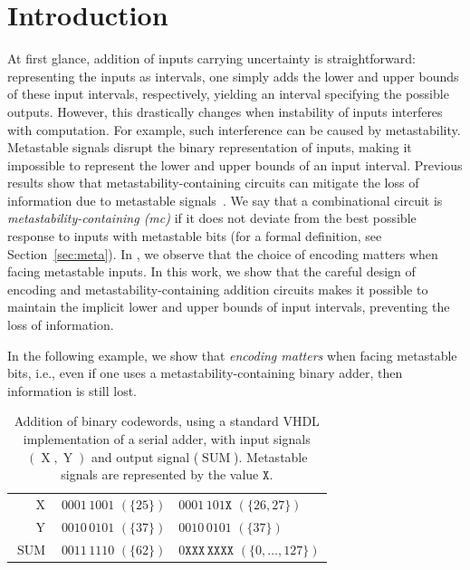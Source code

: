 \documentclass[9pt,journal,compsoc]{IEEEtran}
\theoremstyle{remark}
\newcommand{\mfx}{\mathtt{X}}
\begin{document}
\section{Introduction}\label{sec:intro}

At first glance, addition of inputs carrying uncertainty is straightforward:
representing the inputs as intervals, one simply adds the lower and upper bounds of these input intervals, respectively, yielding an interval specifying the possible outputs.
However, this drastically changes when instability of inputs interferes with computation.
For example, such interference can be caused by metastability.
Metastable signals disrupt the binary representation of inputs, making it impossible to represent the lower and upper bounds of an input interval.
Previous results show that metastability-containing circuits can mitigate the loss of information due to metastable signals~\cite{friedrichs18containing}.
We say that a combinational circuit is \emph{metastability-containing (mc)} if it does not deviate from the best possible response to inputs with metastable bits (for a formal definition, see Section~\ref{sec:meta}). 
In \cite{bund2025small}, we observe that the choice of encoding matters when facing metastable inputs.
In this work, we show that the careful design of encoding and metastability-containing addition circuits makes it possible to maintain the implicit lower and upper bounds of input intervals, preventing the loss of information.

In the following example, we show that \emph{encoding matters} when facing metastable bits, i.e., even if one uses a metastability-containing binary adder, then information is still lost. 

\begin{table}
  \caption{Addition of binary codewords, using a standard VHDL implementation of a serial adder, with input signals $(\operatorname{X}, \operatorname{Y})$ and output signal ($\operatorname{SUM}$). Metastable signals are represented by the value $\mfx$.}
  \label{tab:simu_bin}
  \centering
  \begin{tabular}{rll}
    $\operatorname{X}$ & $0001\,1001$ $(\{25\})$ & $0001\,101\mfx$ $(\{26,27\})$ \\
    $\operatorname{Y}$ & $0010\,0101$ $(\{37\})$ & $0010\,0101$ $(\{37\})$ \\ \hline
    $\operatorname{SUM}$ & $0011\,1110$ $(\{62\})$ & $0\mfx\mfx\mfx\,\mfx\mfx\mfx\mfx$ $(\{0,\hdots,127\})$ 
  \end{tabular}
\end{table}
\end{document}
